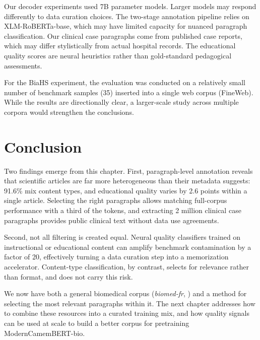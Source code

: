 \begin{reviewread}
Our decoder experiments used 7B parameter models. Larger models may respond differently to data curation choices. The two-stage annotation pipeline relies on XLM-RoBERTa-base, which may have limited capacity for nuanced paragraph classification. Our clinical case paragraphs come from published case reports, which may differ stylistically from actual hospital records. The educational quality scores are neural heuristics rather than gold-standard pedagogical assessments.
\end{reviewread}

\begin{reviewread}
For the BiaHS experiment, the evaluation was conducted on a relatively small number of benchmark samples (35) inserted into a single web corpus (FineWeb). While the results are directionally clear, a larger-scale study across multiple corpora would strengthen the conclusions.
\end{reviewread}


\section*{Conclusion}

\begin{reviewread}
Two findings emerge from this chapter. First, paragraph-level annotation reveals that scientific articles are far more heterogeneous than their metadata suggests: 91.6\% mix content types, and educational quality varies by 2.6 points within a single article. Selecting the right paragraphs allows matching full-corpus performance with a third of the tokens, and extracting 2 million clinical case paragraphs provides public clinical text without data use agreements.
\end{reviewread}

\begin{reviewread}
Second, not all filtering is created equal. Neural quality classifiers trained on instructional or educational content can amplify benchmark contamination by a factor of 20, effectively turning a data curation step into a memorization accelerator. Content-type classification, by contrast, selects for relevance rather than format, and does not carry this risk.
\end{reviewread}

\vspace{2em}

We now have both a general biomedical corpus (\textit{biomed-fr}, ) and a method for selecting the most relevant paragraphs within it. The next chapter addresses how to combine these resources into a curated training mix, and how quality signals can be used at scale to build a better corpus for pretraining ModernCamemBERT-bio.
